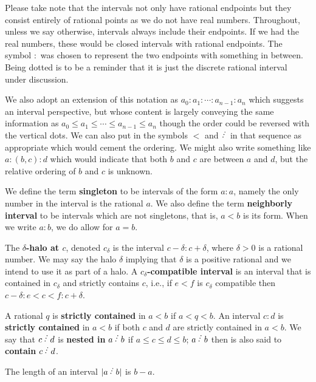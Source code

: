 \documentclass[12pt]{article}
\begin{document}
Please take note that the intervals not only have rational endpoints but they consist entirely of rational points as we do not have real numbers. Throughout, unless we say otherwise, intervals always include their endpoints. If we had the real numbers, these would be closed intervals with rational endpoints.  The symbol $:$ was chosen to represent the two endpoints with something in between. Being dotted is to be a reminder that it is just the discrete rational interval under discussion. 

We also adopt an extension of this notation as $a_0:a_1:\cdots:a_{n-1}:a_n$ which suggests an interval perspective, but whose content is largely conveying the same information as $a_0 \leq a_1 \leq \cdots \leq a_{n-1} \leq a_n$ though the order could be reversed with the vertical dots. We can also put in the symbols $\lt$ and $\lte$ in that sequence as appropriate which would cement the ordering. We might also write something like $a:(b,c):d$ which would indicate that both $b$ and $c$ are between $a$ and $d$, but the relative ordering of $b$ and $c$ is unknown. 

We define the term \textbf{singleton} to be intervals of the form $a:a$, namely the only number in the interval is the rational $a$. We also define the term \textbf{neighborly interval} to be intervals which are not singletons, that is, $a \lt b$ is its form. When we write $a:b$, we do allow for $a=b$. 

The\textbf{ $\delta$-halo at $c$}, denoted $c_{\delta}$ is the interval $c-\delta:c+\delta$, where $\delta>0$ is a rational number. We may say the halo $\delta$ implying that $\delta$ is a positive rational and we intend to use it as part of a halo. A \textbf{$c_{\delta}$-compatible interval} is an interval that is contained in $c_{\delta}$ and strictly contains $c$, i.e., if $e \lt f$ is $c_{\delta}$ compatible then $c-\delta:e\lt c \lt f:c+\delta$. 

A rational $q$ is \textbf{strictly contained} in $a\lt b$ if $a < q < b$. An interval $c:d$ is \textbf{strictly contained} in $a\lt b$ if both $c$ and $d$ are strictly contained in $a \lt b$. We say that $c \lte d$ is \textbf{nested in} $a\lte b$ if $a \leq c \leq d \leq b$; $a \lte b$ then is also said to \textbf{contain} $c \lte d$. 

The length of an interval $|a \lte b |$ is $b-a$. 
\end{document}
